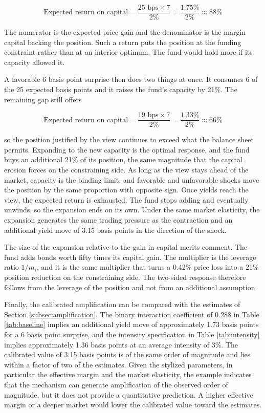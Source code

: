 \documentclass[english, 11pt, oneside]{article}
\begin{document}
\begin{equation*}
\text{Expected return on capital} = \frac{25\text{ bps} \times 7}{2\%}
= \frac{1.75\%}{2\%} \approx 88\%
\end{equation*}

\noindent The numerator is the expected price gain and the denominator is the margin capital backing the position. Such a return puts the position at the funding constraint rather than at an interior optimum. The fund would hold more if its capacity allowed it.

A favorable 6 basis point surprise then does two things at once. It consumes 6 of the 25 expected basis points and it raises the fund's capacity by 21\%. The remaining gap still offers

\begin{equation*}
\text{Expected return on capital} = \frac{19\text{ bps} \times 7}{2\%}
= \frac{1.33\%}{2\%} \approx 66\%
\end{equation*}

\noindent so the position justified by the view continues to exceed what the balance sheet permits. Expanding to the new capacity is the optimal response, and the fund buys an additional 21\% of its position, the same magnitude that the capital erosion forces on the constraining side. As long as the view stays ahead of the market, capacity is the binding limit, and favorable and unfavorable shocks move the position by the same proportion with opposite sign. Once yields reach the view, the expected return is exhausted. The fund stops adding and eventually unwinds, so the expansion ends on its own. Under the same market elasticity, the expansion generates the same trading pressure as the contraction and an additional yield move of 3.15 basis points in the direction of the shock.

The size of the expansion relative to the gain in capital merits comment. The fund adds bonds worth fifty times its capital gain. The multiplier is the leverage ratio $1/m_i$, and it is the same multiplier that turns a 0.42\% price loss into a 21\% position reduction on the constraining side. The two-sided response therefore follows from the leverage of the position and not from an additional assumption.

Finally, the calibrated amplification can be compared with the estimates of Section \ref{subsec:amplification}. The binary interaction coefficient of 0.288 in Table \ref{tab:baseline} implies an additional yield move of approximately 1.73 basis points for a 6 basis point surprise, and the intensity specification in Table \ref{tab:intensity} implies approximately 1.36 basis points at an average intensity of 3\%. The calibrated value of 3.15 basis points is of the same order of magnitude and lies within a factor of two of the estimates. Given the stylized parameters, in particular the effective margin and the market elasticity, the example indicates that the mechanism can generate amplification of the observed order of magnitude, but it does not provide a quantitative prediction. A higher effective margin or a deeper market would lower the calibrated value toward the estimates.
\end{document}
